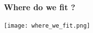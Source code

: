 \documentclass[mathserif, aspectratio=169]{beamer}
\newcommand{\vect}[1]{\boldsymbol{#1}}
\begin{document}

\begin{frame}[fragile]
	\frametitle{Where do we fit ? }
	\begin{center}
		\texttt{[image: where\_we\_fit.png]}
	\end{center}
\end{frame}
\end{document}
